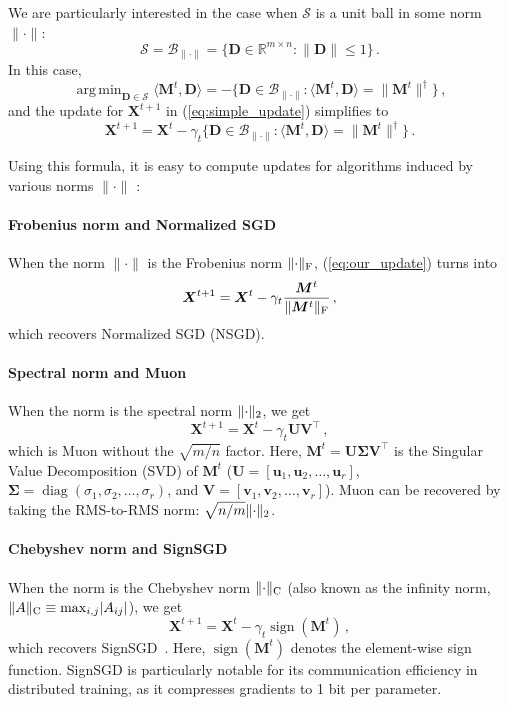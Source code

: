 \documentclass[smallextended,referee,envcountsect]{svjour3}
\def\vu{{\bm{u}}}
\def\vv{{\bm{v}}}
\def\mD{{\bm{D}}}
\def\mM{{\bm{M}}}
\def\mU{{\bm{U}}}
\def\mV{{\bm{V}}}
\def\mX{{\bm{X}}}
\def\mSigma{{\bm{\Sigma}}}
\newcommand{\R}{\mathbb{R}}
\DeclareMathOperator*{\argmin}{arg\,min}
\DeclareMathOperator{\sign}{sign}
\newcommand{\cB}{\mathcal{B}}
\newcommand{\cS}{\mathcal{S}}
\newcommand{\norm}[1]{\lVert #1\rVert}
\DeclarePairedDelimiter{\normf}{\|}{\|_\mathrm{F}}
\DeclarePairedDelimiter{\norms}{\|}{\|_{\mathrm{2}}}
\DeclarePairedDelimiter{\normc}{\|}{\|_{\mathrm{C}}}
\DeclarePairedDelimiter{\abs}{\lvert}{\rvert}
\def\<#1,#2>{\langle #1,#2\rangle}
\DeclareMathOperator{\diag}{diag}
\newcommand{\Rmn}{\R^{m\times n}}
\begin{document}
 We are particularly interested in the case when $\cS$ is a unit ball in some norm $\norm{\cdot}$:
 \[
 \cS = \cB_{\norm{\cdot}} = \{ \mD \in \Rmn : \norm{\mD} \leq 1 \}\,.
 \]
 In this case,
 \[
 \argmin_{\mD \in \cS} \<\mM^t, \mD> = - \{ \mD \in \cB_{\norm{\cdot}} : \<\mM^t, \mD> = \norm{\mM^t}^\dagger\}\,,
 \]
 and the update for $\mX^{t + 1}$ in (\ref{eq:simple_update}) simplifies to
 \begin{equation}\label{eq:our_update}
   \mX^{t+1} = \mX^{t} - \gamma_t \{\mD \in \cB_{\norm{\cdot}} : \<\mM^t, \mD> = \norm{\mM^t}^\dagger\}\,.
 \end{equation}
 
 Using this formula, it is easy to compute updates for algorithms induced by various norms $\norm{\cdot}$ \citep{bernstein2024oldoptimizernewnorm, pethick2025training}:
 
 \paragraph{Frobenius norm and Normalized SGD}
 When the norm $\norm{\cdot}$ is the Frobenius norm $\normf{\cdot}$, (\ref{eq:our_update}) turns into
 \begin{equation}\label{eq:nsgd_update}
   \mX^{t+1} = \mX^{t} - \gamma_t \frac{\mM^t}{\normf{\mM^t}}\,,
 \end{equation}
 which recovers Normalized SGD (NSGD).
 
 \paragraph{Spectral norm and Muon}
 When the norm is the spectral norm $\norms{\cdot}$, we get
 \begin{equation}\label{eq:muon_update}
   \mX^{t+1} = \mX^{t} - \gamma_t \mU \mV^\top\,,
 \end{equation}
 which is Muon without the $\sqrt{m/n}$ factor.
 Here, $\mM^t = \mU \mSigma \mV^\top$ is the Singular Value Decomposition (SVD) of $\mM^t$ ($\mU = [\vu_1, \vu_2, \dots, \vu_r]$, $\mSigma = \diag(\sigma_1, \sigma_2, \dots, \sigma_r)$, and $\mV = [\vv_1, \vv_2, \dots, \vv_r]$). Muon can be recovered by taking the RMS-to-RMS norm: $\sqrt{n/m}\norms{\cdot}$.
 
 \paragraph{Chebyshev norm and SignSGD}
 When the norm is the Chebyshev norm $\normc{\cdot}$ (also known as the infinity norm, $\normc{A} \equiv \max_{i,j}\abs{A_{ij}}$), we get
 \begin{equation}\label{eq:signsgd_update}
   \mX^{t+1} = \mX^{t} - \gamma_t \sign(\mM^t)\,,
 \end{equation}
 which recovers SignSGD~\citep{bernstein2018signsgd}. Here, $\sign(\mM^t)$ denotes the element-wise sign function. SignSGD is particularly notable for its communication efficiency in distributed training, as it compresses gradients to 1 bit per parameter.
 
\end{document}
